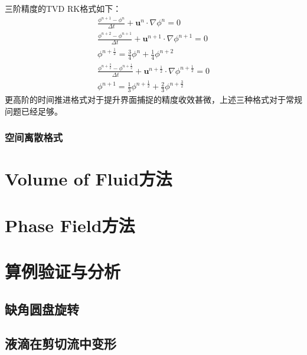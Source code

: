 \documentclass[10pt]{article}
\begin{document}
三阶精度的TVD RK格式如下：
\begin{eqnarray}
    \frac{\phi^{n+1}-\phi^n}{\Delta t}+\bm{u}^n\cdot\nabla\phi^n=0 \\
    \frac{\phi^{n+2}-\phi^{n+1}}{\Delta t}+\bm{u}^{n+1}\cdot\nabla\phi^{n+1}=0 \\
    \phi^{n+\frac{1}{2}}=\frac{3}{4}\phi^n+\frac{1}{4}\phi^{n+2} \\
    \frac{\phi^{n+\frac{3}{2}}-\phi^{n+\frac{1}{2}}}{\Delta t}+\bm{u}^{n+\frac{1}{2}}\cdot\nabla\phi^{n+\frac{1}{2}}=0 \\
    \phi^{n+1}=\frac{1}{3}\phi^{n+\frac{1}{2}}+\frac{2}{3}\phi^{n+\frac{3}{2}}
\end{eqnarray}
更高阶的时间推进格式对于提升界面捕捉的精度收效甚微，上述三种格式对于常规问题已经足够。

\subsubsection{空间离散格式}

\newpage
\section{Volume of Fluid方法}

\newpage
\section{Phase Field方法}

\newpage
\section{算例验证与分析}
\subsection{缺角圆盘旋转}

\subsection{液滴在剪切流中变形}



\end{document}
